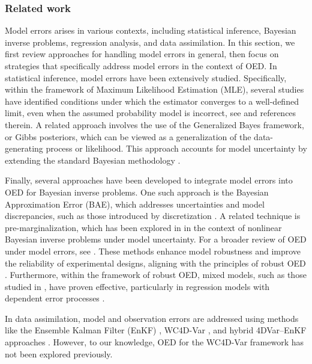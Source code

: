 \documentclass{aims} %
\theoremstyle{definition}
\begin{document}
\subsubsection*{Related work}  
Model  errors arises in various contexts, including statistical inference, Bayesian inverse problems, regression analysis, and data assimilation. In this section, we first review approaches for handling model errors in general, then focus on strategies that specifically address model errors in the context of OED.
%
In statistical inference, model errors have been extensively studied. Specifically, within the framework of Maximum Likelihood Estimation (MLE), several studies have identified conditions under which the estimator converges to a well-defined limit, even when the assumed probability model is incorrect, see \cite{Halbert} and references therein. A related approach involves the use of the Generalized Bayes framework, or Gibbs posteriors, which can be viewed as a generalization of the data-generating process or likelihood. This approach accounts for model uncertainty by extending the standard Bayesian methodology \cite{Baek_2023}.


Finally, several approaches have been developed to integrate model errors into OED for Bayesian inverse problems. 
One such approach is the Bayesian Approximation Error (BAE), which addresses uncertainties and model discrepancies, such as those introduced by discretization \cite[Chapter 7]{Kaipio:1338003}. A related technique is pre-marginalization, which has been explored in \cite{alexanderian2024optimaldesignlargescalenonlinear} in the context of nonlinear Bayesian inverse problems under model uncertainty. 
For a broader review of OED under model errors, see \cite[Section 6.1]{Huan_Jagalur_Marzouk_2024}. 
These methods enhance model robustness and improve the reliability of experimental designs, aligning with the principles of robust OED \cite{Scarinci2021BayesianIU, ASPREY2002545, attia2023robustaoptimalexperimentaldesign}. Furthermore, within the framework of robust OED,  mixed models, such as those studied in \cite{Tsirpitzi2023}, have proven effective, particularly in regression models with dependent error processes \cite{SacksI, Dette}.


In data assimilation, model and observation errors are addressed using methods like the Ensemble Kalman Filter (EnKF) \cite{Tippett2003EnsembleSR}, WC4D-Var \cite{Freitag}, and hybrid 4DVar–EnKF approaches \cite{Dong, EnKFandHybridGain}.
However, to our knowledge, OED for the WC4D-Var framework has not been explored previously.
%
\end{document}
